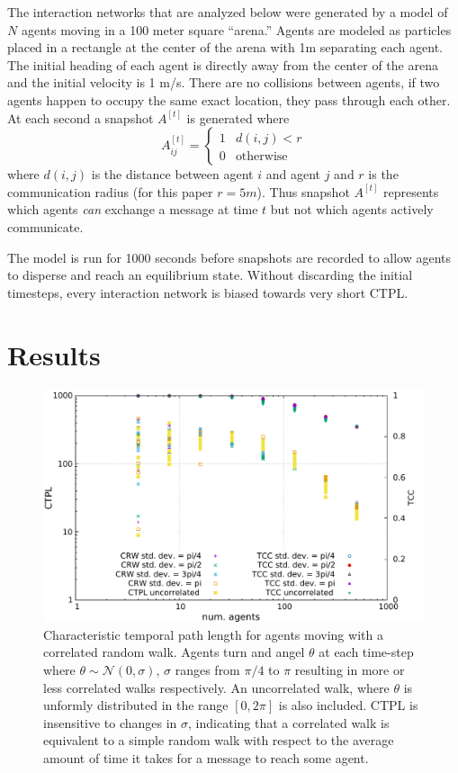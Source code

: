 \documentclass[conference]{IEEEtran}
\newcommand{\adj}[1]{A^{[#1]}}
\begin{document}
The interaction networks that are analyzed below were generated by a
model of $N$ agents moving in a 100 meter square ``arena.'' Agents are
modeled as particles placed in a rectangle at the center of the arena
with 1m separating each agent. The initial heading of each agent is
directly away from the center of the arena and the initial velocity is
1 m/s. There are no collisions between agents, if two agents happen to
occupy the same exact location, they pass through each other. At each
second a snapshot $\adj{t}$ is generated where
\begin{equation}
  \adj{t}_{ij} = \begin{cases} 1 & d(i, j) < r \\ 0 & \text{otherwise} \end{cases}
  \label{eq:snapshot}
\end{equation}
where $d(i,j)$ is the distance between agent $i$ and agent $j$ and $r$
is the communication radius (for this paper $r = 5 m$). Thus snapshot
$\adj{t}$ represents which agents \emph{can} exchange a message at
time $t$ but not which agents actively communicate.

The model is run for 1000 seconds before snapshots are recorded to
allow agents to disperse and reach an equilibrium state. Without
discarding the initial timesteps, every interaction network is biased
towards very short CTPL.

\section{Results}

\begin{figure}
  \includegraphics[width=\columnwidth]{correlated-scaling}
  \caption{Characteristic temporal path length for agents moving with
    a correlated random walk. Agents turn and angel $\theta$ at each
    time-step where $\theta \sim \mathcal{N}(0,\sigma)$, $\sigma$
    ranges from $\pi/4$ to $\pi$ resulting in more or less correlated
    walks respectively. An uncorrelated walk, where $\theta$ is
    unformly distributed in the range $[0, 2\pi]$ is also
    included. CTPL is insensitive to changes in $\sigma$, indicating
    that a correlated walk is equivalent to a simple random walk with
    respect to the average amount of time it takes for a message to
    reach some agent.}
  \label{fig:crw-scale}
\end{figure}
\end{document}
